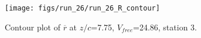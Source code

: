 \begin{figure}[H]
\centering
\texttt{[image: figs/run\_26/run\_26\_R\_contour]}
\caption{Contour plot of $\overline{r}$ at $z/c$=7.75, $V_{free}$=24.86, station 3.}
\label{fig:run_26_R_contour}
\end{figure}


